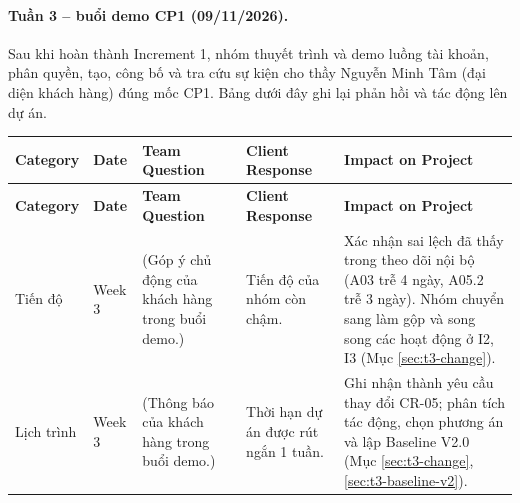 \paragraph*{Tuần 3 -- buổi demo CP1 (09/11/2026).}

Sau khi hoàn thành Increment 1, nhóm thuyết trình và demo luồng tài khoản, phân quyền, tạo, công bố và tra cứu sự kiện cho thầy Nguyễn Minh Tâm (đại diện khách hàng) đúng mốc CP1. Bảng dưới đây ghi lại phản hồi và tác động lên dự án.

\begingroup
\setlength{\tabcolsep}{2pt}
\setlength{\parskip}{0pt}
\renewcommand{\arraystretch}{1.15}
\footnotesize
\begin{longtable}{>{\RaggedRight\arraybackslash}p{1.70cm}
                  >{\RaggedRight\arraybackslash}p{0.85cm}
                  >{\RaggedRight\arraybackslash}p{3.95cm}
                  >{\RaggedRight\arraybackslash}p{4.20cm}
                  >{\RaggedRight\arraybackslash}p{4.15cm}}
\rowcolor{headerblue}
\color{white}\textbf{Category} &
\color{white}\textbf{Date} &
\color{white}\textbf{Team Question} &
\color{white}\textbf{Client Response} &
\color{white}\textbf{Impact on Project} \\
\endfirsthead
\rowcolor{headerblue}
\color{white}\textbf{Category} &
\color{white}\textbf{Date} &
\color{white}\textbf{Team Question} &
\color{white}\textbf{Client Response} &
\color{white}\textbf{Impact on Project} \\
\endhead

\rowcolor{lightgray}
Tiến độ & Week 3 &
(Góp ý chủ động của khách hàng trong buổi demo.) &
Tiến độ của nhóm còn chậm. &
Xác nhận sai lệch đã thấy trong theo dõi nội bộ (A03 trễ 4 ngày, A05.2 trễ 3 ngày). Nhóm chuyển sang làm gộp và song song các hoạt động ở I2, I3 (Mục \ref{sec:t3-change}). \\

Lịch trình & Week 3 &
(Thông báo của khách hàng trong buổi demo.) &
Thời hạn dự án được rút ngắn 1 tuần. &
Ghi nhận thành yêu cầu thay đổi CR-05; phân tích tác động, chọn phương án và lập Baseline V2.0 (Mục \ref{sec:t3-change}, \ref{sec:t3-baseline-v2}). \\

\bottomrule
\end{longtable}
\endgroup